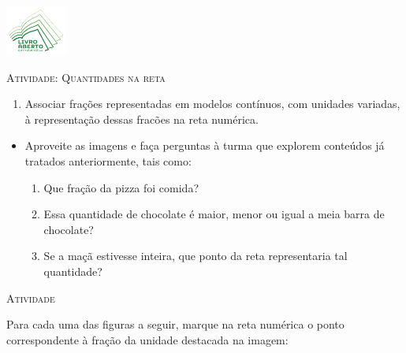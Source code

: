 \documentclass[10 pt,usenames,dvipsnames, oneside]{article}
\begin{document}
\begin{center}
  \begin{minipage}[l]{3cm}
\includegraphics[width=2cm]{../../../Figuras/logo}       
\end{minipage}\hfill
\begin{minipage}[r]{.8\textwidth}
 {\Large \scshape Atividade: Quantidades na reta}  
\end{minipage}
\end{center}
\vspace{.2cm}

\ifdefined\prof
\begin{goals}
\begin{enumerate}
\item Associar frações representadas em modelos contínuos, com unidades variadas, à representação dessas fracões na reta numérica.
\end{enumerate}

\tcblower

\begin{itemize}
\item Aproveite as imagens e faça perguntas à turma que explorem conteúdos já tratados anteriormente, tais como: 

\begin{enumerate}[label=\alph*)]
\item Que fração da pizza foi comida? 
\item Essa quantidade de chocolate é maior, menor ou igual a meia barra de chocolate?
\item Se a maçã estivesse inteira, que ponto da reta representaria tal quantidade?
\end{enumerate}

\end{itemize}
\end{goals}

\bigskip
\begin{center}
{\large \scshape Atividade}
\end{center}
\fi

Para cada uma das figuras a seguir, marque na reta numérica o ponto correspondente à fração da unidade destacada na imagem:
\end{document}
